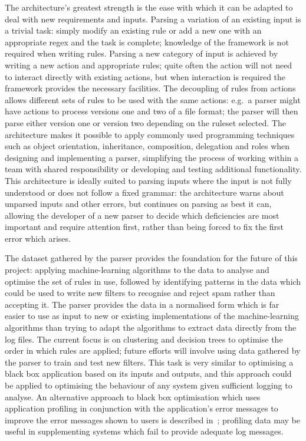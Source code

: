 \documentclass[draft]{svmult}
\begin{document}
The architecture's greatest strength is the ease with which it can be
adapted to deal with new requirements and inputs.  Parsing a variation of
an existing input is a trivial task: simply modify an existing rule or add
a new one with an appropriate regex and the task is complete; knowledge of
the framework is not required when writing rules.  Parsing a new category
of input is achieved by writing a new action and appropriate rules; quite
often the action will not need to interact directly with existing actions,
but when interaction is required the framework provides the necessary
facilities.  The decoupling of rules from actions allows different sets of
rules to be used with the same actions: e.g.\ a parser might have actions
to process versions one and two of a file format; the parser will then
parse either version one or version two depending on the ruleset selected.
The architecture makes it possible to apply commonly used programming
techniques such as object orientation, inheritance, composition, delegation
and roles when designing and implementing a parser, simplifying the process
of working within a team with shared responsibility or developing and
testing additional functionality.  This architecture is ideally suited to
parsing inputs where the input is not fully understood or does not follow a
fixed grammar: the architecture warns about unparsed inputs and other
errors, but continues on parsing as best it can, allowing the developer of
a new parser to decide which deficiencies are most important and require
attention first, rather than being forced to fix the first error which
arises.

The dataset gathered by the parser provides the foundation for the future
of this project: applying machine-learning algorithms to the data to
analyse and optimise the set of rules in use, followed by identifying
patterns in the data which could be used to write new filters to recognise
and reject spam rather than accepting it.  The parser provides the data in
a normalised form which is far easier to use as input to new or existing
implementations of the machine-learning algorithms than trying to adapt the
algorithms to extract data directly from the log files.  The current focus
is on clustering and decision trees to optimise the order in which rules
are applied; future efforts will involve using data gathered by the parser
to train and test new filters.  This task is very similar to optimising a
black box application based on its inputs and outputs, and this approach
could be applied to optimising the behaviour of any system given sufficient
logging to analyse.  An alternative approach to black box optimisation
which uses application profiling in conjunction with the application's
error messages to improve the error messages shown to users is described
in~\cite{black-box-error-reporting}; profiling data may be useful in
supplementing systems which fail to provide adequate log messages.
\end{document}
